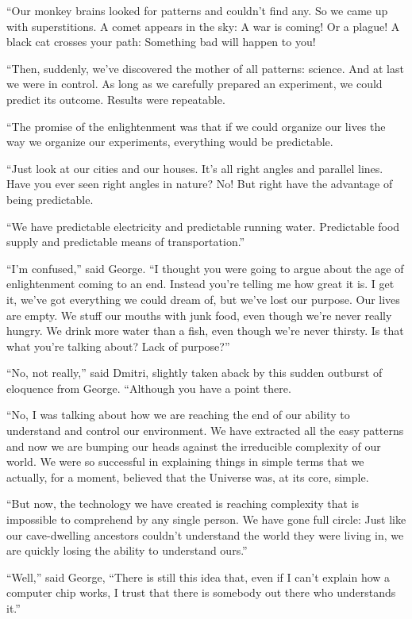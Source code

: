 \documentclass{memoir}
\begin{document}
``Our monkey brains looked for patterns and couldn't find any. So we came up with superstitions. A comet appears in the sky: A war is coming! Or a plague! A black cat crosses your path: Something bad will happen to you!

``Then, suddenly, we've discovered the mother of all patterns: science. And at last we were in control. As long as we carefully prepared an experiment, we could predict its outcome. Results were repeatable. 

``The promise of the enlightenment was that if we could organize our lives the way we organize our experiments, everything would be predictable. 

``Just look at our cities and our houses. It's all right angles and parallel lines. Have you ever seen right angles in nature? No! But right have the advantage of being predictable. 

``We have predictable electricity and predictable running water. Predictable food supply and predictable means of transportation.''

``I'm confused,'' said George. ``I thought you were going to argue about the age of enlightenment coming to an end. Instead you're telling me how great it is. I get it, we've got everything we could dream of, but we've lost our purpose. Our lives are empty. We stuff our mouths with junk food, even though we're never really hungry. We drink more water than a fish, even though we're never thirsty. Is that what you're talking about? Lack of purpose?''

``No, not really,'' said Dmitri, slightly taken aback by this sudden outburst of eloquence from George. ``Although you have a point there.

``No, I was talking about how we are reaching the end of our ability to understand and control our environment. We have extracted all the easy patterns and now we are bumping our heads against the irreducible complexity of our world. We were so successful in explaining things in simple terms that we actually, for a moment, believed that the Universe was, at its core, simple. 

``But now, the technology we have created is reaching complexity that is impossible to comprehend by any single person. We have gone full circle: Just like our cave-dwelling ancestors couldn't understand the world they were living in, we are quickly losing the ability to understand ours.''

``Well,''  said George, ``There is still this idea that, even if I can't explain how a computer chip works, I trust that there is somebody out there who understands it.''
\end{document}
